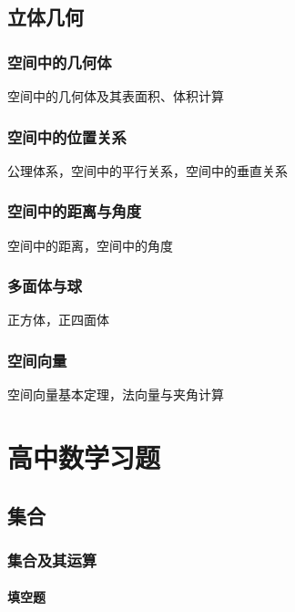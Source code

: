 \documentclass[lang=cn, zihao=4.5]{elegantbook}
\begin{document}
\chapter{立体几何}

\section{空间中的几何体}

空间中的几何体及其表面积、体积计算

\section{空间中的位置关系}

公理体系，空间中的平行关系，空间中的垂直关系

\section{空间中的距离与角度}

空间中的距离，空间中的角度

\section{多面体与球}

正方体，正四面体

\section{空间向量}

空间向量基本定理，法向量与夹角计算

\setcounter{chapter}{0}
\part{高中数学习题}

\chapter{集合}

\section{集合及其运算}

\subsection*{填空题}
\end{document}
